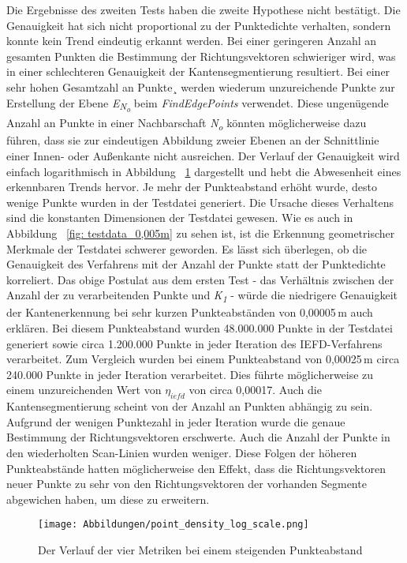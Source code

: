 Die Ergebnisse des zweiten Tests haben die zweite Hypothese nicht bestätigt. Die Genauigkeit hat sich nicht proportional zu der Punktedichte verhalten, sondern konnte kein Trend eindeutig erkannt werden. Bei einer geringeren Anzahl an gesamten Punkten die Bestimmung der Richtungsvektoren schwieriger wird, was in einer schlechteren Genauigkeit der Kantensegmentierung resultiert. Bei einer sehr hohen Gesamtzahl an Punkte¸ werden wiederum unzureichende Punkte zur Erstellung der Ebene \textit{E\textsubscript{N\textsubscript{o}}} beim \textit{FindEdgePoints} verwendet. Diese ungenügende Anzahl an Punkte in einer Nachbarschaft \textit{N\textsubscript{o}} könnten möglicherweise dazu führen, dass sie zur eindeutigen Abbildung zweier Ebenen an der Schnittlinie einer Innen- oder Außenkante nicht ausreichen. Der Verlauf der Genauigkeit wird einfach logarithmisch in Abbildung ~\ref{fig: point_density_trend} dargestellt und hebt die Abwesenheit eines erkennbaren Trends hervor. Je mehr der Punkteabstand erhöht wurde, desto wenige Punkte wurden in der Testdatei generiert. Die Ursache dieses Verhaltens sind die konstanten Dimensionen der Testdatei gewesen. Wie es auch in Abbildung ~\ref{fig: testdata_0,005m} zu sehen ist, ist die Erkennung geometrischer Merkmale der Testdatei schwerer geworden. Es lässt sich überlegen, ob die Genauigkeit des Verfahrens mit der Anzahl der Punkte statt der Punktedichte korreliert. Das obige Postulat aus dem ersten Test - das Verhältnis zwischen der Anzahl der zu verarbeitenden Punkte und \textit{K\textsubscript{1}} - würde die niedrigere Genauigkeit der Kantenerkennung bei sehr kurzen Punkteabständen von 0,00005\,\si{\m} auch erklären. Bei diesem Punkteabstand wurden 48.000.000 Punkte in der Testdatei generiert sowie circa 1.200.000 Punkte in jeder Iteration des IEFD-Verfahrens verarbeitet. Zum Vergleich wurden bei einem Punkteabstand von 0,00025\,\si{\m} circa 240.000 Punkte in jeder Iteration verarbeitet. Dies führte möglicherweise zu einem unzureichenden Wert von $\eta_{iefd}$ von circa 0,00017. Auch die Kantensegmentierung scheint von der Anzahl an Punkten abhängig zu sein. Aufgrund der wenigen Punktezahl in jeder Iteration  wurde die genaue Bestimmung der Richtungsvektoren erschwerte. Auch die Anzahl der Punkte in den wiederholten Scan-Linien wurden weniger. Diese Folgen der höheren Punkteabstände hatten möglicherweise den Effekt, dass die Richtungsvektoren neuer Punkte zu sehr von den Richtungsvektoren der vorhanden Segmente abgewichen haben, um diese zu erweitern. 

\begin{figure}[t]
	\texttt{[image: Abbildungen/point\_density\_log\_scale.png]}
	\centering
	\caption{Der Verlauf der vier Metriken bei einem steigenden Punkteabstand}
	\label{fig: point_density_trend}
\end{figure}

